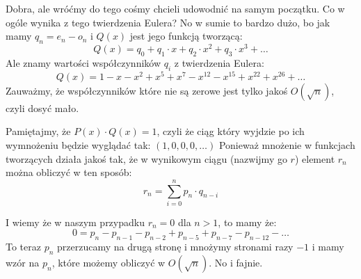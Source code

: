 Dobra, ale wróćmy do tego cośmy chcieli udowodnić na samym początku. Co w ogóle wynika z tego twierdzenia Eulera? No w sumie to bardzo dużo, bo jak mamy $q_n = e_n - o_n$ i $Q(x)$ jest jego funkcją tworzącą:
\begin{equation*}
	Q(x) = q_0 + q_1 \cdot x + q_2 \cdot x^2 + q_3 \cdot x^3 + \dots
\end{equation*}
Ale znamy wartości współczynników $q_i$ z twierdzenia Eulera:
\begin{equation*}
	Q(x) = 1 - x - x^2 + x^5 + x^7 - x^{12} - x^{15} + x^{22} + x^{26} + \dots
\end{equation*}
Zauważmy, że współczynników które nie są zerowe jest tylko jakoś $O(\sqrt{n})$, czyli dosyć mało.

Pamiętajmy, że $P(x) \cdot Q(x) = 1$, czyli że ciąg który wyjdzie po ich wymnożeniu będzie wyglądać tak: $(1,0,0,0, \dots)$ Ponieważ mnożenie w funkcjach tworzących działa jakoś tak, że w wynikowym ciągu (nazwijmy go $r$) element $r_n$ można obliczyć w ten sposób:
\begin{equation*}
	r_n = \sum_{i=0}^{n} p_n \cdot q_{n-i}
\end{equation*}

I wiemy że w naszym przypadku $r_n = 0$ dla $n > 1$, to mamy że: \begin{equation*}
	0 = p_n - p_{n-1} - p_{n-2} + p_{n-5} + p_{n-7} - p_{n-12} - \dots
\end{equation*}
To teraz $p_n$ przerzucamy na drugą stronę i mnożymy stronami razy $-1$ i mamy wzór na $p_n$, które możemy obliczyć w $O(\sqrt{n})$. No i fajnie.